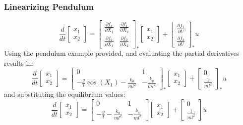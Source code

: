 \subsubsection{Linearizing Pendulum}
\begin{equation*}
  \frac{d}{dt}\begin{bmatrix} x_{1} \\[0.6em] x_{2} \end{bmatrix}=
  \begin{bmatrix}
    \frac{\partial{}f_1}{\partial{}X_{1}} & \frac{\partial{}f_{1}}{\partial{}X_{2}} \\[0.8em]
    \frac{\partial{}f_2}{\partial{}X_{1}} & \frac{\partial{}f_{2}}{\partial{}X_{2}}
  \end{bmatrix}_{*}
  \begin{bmatrix}
    x_{1} \\[0.6em]
    x_{2}
  \end{bmatrix} +
  \begin{bmatrix}
    \frac{\partial{}f_{1}}{\partial{}U} \\[0.6em]
    \frac{\partial{}f_{2}}{\partial{}U}
  \end{bmatrix}_{*}u
\end{equation*}
Using the pendulum example provided, and evaluating the partial derivatives results in:
\begin{equation*}
  \frac{d}{dt}
  \begin{bmatrix}
    x_{1} \\[0.6em]
    x_{2}
  \end{bmatrix} =
  \begin{bmatrix}
    0 & 1 \\[0.6em]
    -\frac{g}{l}\cos (X_{1})-\frac{k_{\theta}}{ml^2} & -\frac{k_{\dot{\theta}}}{ml^2}
  \end{bmatrix}_{*}
  \begin{bmatrix}
    x_{1} \\[0.6em]
    x_{2}
  \end{bmatrix} +
  \begin{bmatrix}
    0 \\[0.6em]
    \frac{1}{ml^2}
  \end{bmatrix}_{*}u
\end{equation*}
and substituting the equilibrium values:
\begin{equation}\label{linearizedsys}
  \frac{d}{dt}
  \begin{bmatrix}
    x_{1} \\[0.6em]
    x_{2}
  \end{bmatrix} =
  \begin{bmatrix}
    0 & 1 \\[0.6em]
    -\frac{g}{l}-\frac{k_{\theta}}{ml^2} & -\frac{k_{\dot{\theta}}}{ml^2}
  \end{bmatrix}
  \begin{bmatrix}
    x_{1} \\[0.6em]
    x_{2}
  \end{bmatrix} +
  \begin{bmatrix}
    0 \\[0.6em]
    \frac{1}{ml^2}
  \end{bmatrix}u
\end{equation}
